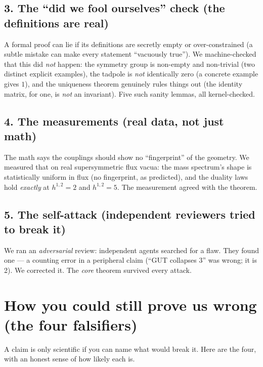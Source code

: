 \documentclass[11pt]{article}
\begin{document}
\subsection*{3. The ``did we fool ourselves'' check (the definitions are real)}

A formal proof can lie if its definitions are secretly empty or over-constrained (a subtle
mistake can make every statement ``vacuously true''). We machine-checked that this did
\emph{not} happen: the symmetry group is non-empty and non-trivial (two distinct explicit
examples), the tadpole is \emph{not} identically zero (a concrete example gives $1$), and
the uniqueness theorem genuinely rules things out (the identity matrix, for one, is
\emph{not} an invariant). Five such sanity lemmas, all kernel-checked.

\subsection*{4. The measurements (real data, not just math)}

The math says the couplings should show no ``fingerprint'' of the geometry. We measured
that on real supersymmetric flux vacua: the mass spectrum's shape is statistically uniform
in flux (no fingerprint, as predicted), and the duality laws hold \emph{exactly} at
$h^{1,2}=2$ and $h^{1,2}=5$. The measurement agreed with the theorem.

\subsection*{5. The self-attack (independent reviewers tried to break it)}

We ran an \emph{adversarial} review: independent agents searched for a flaw. They found
one --- a counting error in a peripheral claim (``GUT collapses 3'' was wrong; it is 2).
We corrected it. The \emph{core} theorem survived every attack.

\section*{How you could still prove us wrong (the four falsifiers)}

A claim is only scientific if you can name what would break it. Here are the four, with an
honest sense of how likely each is.
\end{document}
